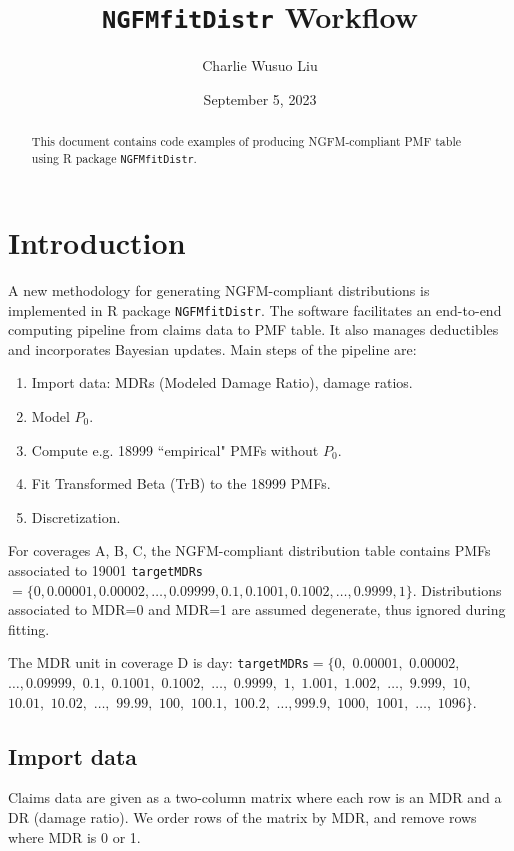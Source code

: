 \documentclass[12pt,letterpaper]{article}
\title{  \texttt{NGFMfitDistr} Workflow  }
\author{Charlie Wusuo Liu}
\begin{document}

\date{September 5, 2023}

\maketitle

\begin{abstract}
This document contains code examples of producing NGFM-compliant PMF table using R package \texttt{NGFMfitDistr}.
\end{abstract}

\tableofcontents

\section{Introduction}

A new methodology for generating NGFM-compliant distributions is implemented in R package \texttt{NGFMfitDistr}. The software facilitates an end-to-end computing pipeline from claims data to PMF table. It also manages deductibles and incorporates Bayesian updates. Main steps of the pipeline are:

\begin{enumerate}
\item  Import data: MDRs (Modeled Damage Ratio), damage ratios.
\item  Model $P_0$.
\item  Compute e.g. 18999 ``empirical" PMFs without $P_0$.
\item  Fit Transformed Beta (TrB) to the 18999 PMFs.
\item  Discretization.
\end{enumerate}

For coverages A, B, C, the NGFM-compliant distribution table contains PMFs associated to 19001 \texttt{targetMDRs} $=\{0,0.00001,0.00002,\ldots,0.09999,0.1,0.1001,0.1002,\ldots,0.9999,1\}$. Distributions associated to MDR=0 and MDR=1 are assumed degenerate, thus ignored during fitting.

The MDR unit in coverage D is day: \texttt{targetMDRs}$=\{0,$ $0.00001,$ $0.00002,$ $\ldots,0.09999,$ $0.1,$ $0.1001,$ $0.1002,$ $\ldots,$ $0.9999,$ $1,$ $1.001,$ $1.002,$ $\ldots,$ $9.999,$ $10,$ $10.01,$ $10.02,$ $\ldots,$ $99.99,$ $100,$ $100.1,$ $100.2,$ $\ldots,999.9,$ $1000,$ $1001,$ $\ldots,$ $1096\}$.

\subsection{Import data}
Claims data are given as a two-column matrix where each row is an MDR and a DR (damage ratio). We order rows of the matrix by MDR, and remove rows where MDR is 0 or 1.
\end{document}
